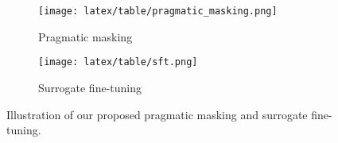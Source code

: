 \begin{figure*}[h]
\centering
\begin{subfigure}[]{.5\textwidth}
  \centering
  \texttt{[image: latex/table/pragmatic\_masking.png]}
  \caption{Pragmatic masking}
  \label{fig:pm}
\end{subfigure}%
\begin{subfigure}[]{.5\textwidth}
  \centering
  \texttt{[image: latex/table/sft.png]}
  \caption{Surrogate fine-tuning}
  \label{fig:sft}
\end{subfigure}
\caption{Illustration of our proposed pragmatic masking and surrogate fine-tuning.}
\label{fig:illustration}
\end{figure*}
